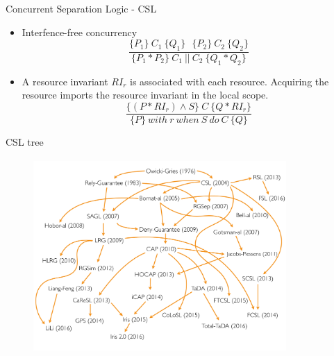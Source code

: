 \documentclass[11pt]{beamer}
\begin{document}

\begin{frame}{Concurrent Separation Logic - CSL}
  \begin{itemize}
  \item Interfence-free concurrency
    $$\frac{\{P_1\}~C_1~\{Q_1\}~~~\{P_2\}~C_2~\{Q_2\}}{\{P_1 \ast P_2\}~C_1~||~C_2 ~\{Q_1 \ast Q_2
    \}}$$
    \pause
  \item A resource invariant $RI_r$ is associated with each resource. Acquiring
    the resource imports the resource invariant in the local scope.
    $$\frac{\{(P \ast RI_r) \land S\}~C~\{Q \ast RI_r\}}{\{P\}~with~r~when~S~do~C~\{Q\}}$$
  \end{itemize}
\end{frame}

\begin{frame}{CSL tree}
  \begin{figure}
  	\includegraphics[width=26em,height=20em]{./images/CSL-Family-Tree.pdf}
  \end{figure}
\end{frame}

\end{document}
